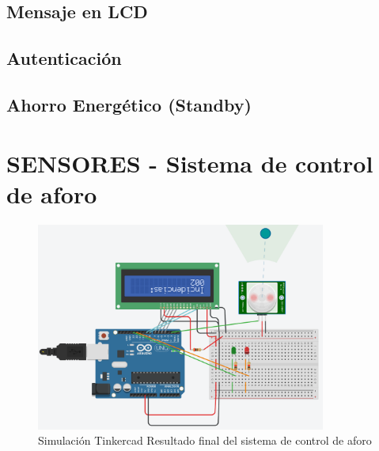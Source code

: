 \subsection{Mensaje en LCD}

\subsection{Autenticación}

\subsection{Ahorro Energético (Standby)}

\section{SENSORES - Sistema de control de aforo}


\begin{figure}[H]
    \centering
    \includegraphics[width=0.85\textwidth]{./img/ckpt_9.png}
    \caption{Simulación Tinkercad Resultado final del sistema de control de aforo}
    \label{fig:control_aforo}
\end{figure}

